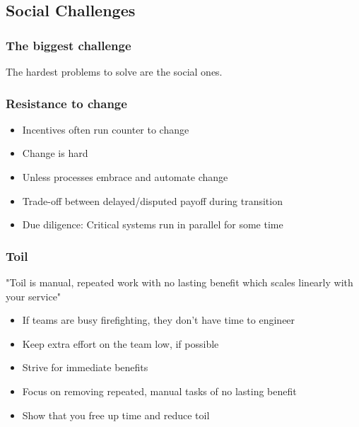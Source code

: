 \documentclass[t]{beamer}
\begin{document}
\subsection{Social Challenges}

\begin{frame}
	\frametitle{The biggest challenge}
		\begin{center}
			\vfill
			The hardest problems to solve are the social ones.
			\vfill
		\end{center}
\end{frame}

\begin{frame}
	\frametitle{Resistance to change}
	\begin{itemize}
		\item Incentives often run counter to change
		\item Change is hard
		\item Unless processes embrace and automate change
		\item Trade-off between delayed/disputed payoff during transition
		\item Due diligence: Critical systems run in parallel for some time
	\end{itemize}
\end{frame}

\begin{frame}
	\frametitle{Toil}
	"Toil is manual, repeated work with no lasting benefit which scales linearly with your service"
	\vfill
	\begin{itemize}
		\item If teams are busy firefighting, they don't have time to engineer
		\item Keep extra effort on the team low, if possible
		\item Strive for immediate benefits
		\item Focus on removing repeated, manual tasks of no lasting benefit
		\item Show that you free up time and reduce toil
	\end{itemize}
	\vfill
\end{frame}
\end{document}

